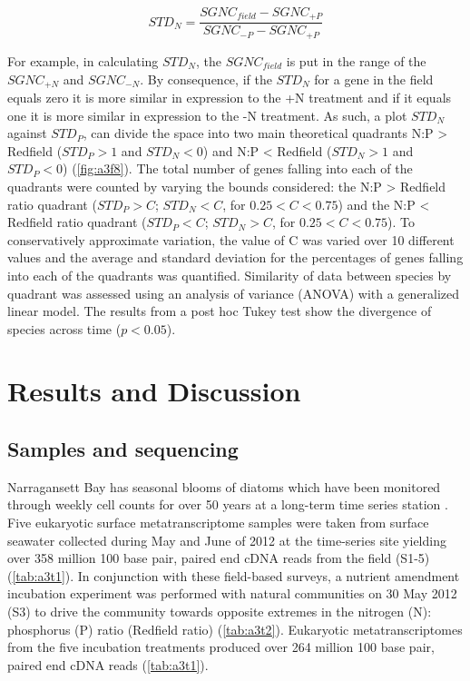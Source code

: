 \begin{equation}
	\label{eq:STDP}
	STD_N = \frac{SGNC_{field} - SGNC_{+P}}{SGNC_{-P} - SGNC_{+P}} 	
\end{equation}

For example, in calculating $STD_N$, the $SGNC_{field}$ is put in the range of the $SGNC_{+N}$ and $SGNC_{-N}$. By consequence, if the $STD_N$ for a gene in the field equals zero it is more similar in expression to the +N treatment and if it equals one it is more similar in expression to the -N treatment. As such, a plot $STD_N$ against $STD_P$, can divide the space into two main theoretical quadrants N:P > Redfield ($STD_P > 1$ and $STD_N < 0$) and N:P < Redfield ($STD_N > 1$ and $STD_P < 0$) (\cref{fig:a3f8}). The total number of genes falling into each of the quadrants were counted by varying the bounds considered: the N:P > Redfield ratio quadrant ($STD_P > C$; $STD_N < C$, for $0.25 < C < 0.75$) and the N:P < Redfield ratio quadrant ($STD_P < C$; $STD_N > C$, for $0.25 < C < 0.75$). To conservatively approximate variation, the value of C was varied over 10 different values and the average and standard deviation for the percentages of genes falling into each of the quadrants was quantified. Similarity of data between species by quadrant was assessed using an analysis of variance (ANOVA) with a generalized linear model. The results from a post hoc Tukey test show the divergence of species across time ($p < 0.05$).

\section{Results and Discussion}
\subsection{Samples and sequencing}
Narragansett Bay has seasonal blooms of diatoms which have been monitored through weekly cell counts for over 50 years at a long-term time series station \citep{Borkman2009, Li1998}. Five eukaryotic surface metatranscriptome samples were taken from surface seawater collected during May and June of 2012 at the time-series site yielding over 358 million 100 base pair, paired end cDNA reads from the field (S1-5) (\cref{tab:a3t1}). In conjunction with these field-based surveys, a nutrient amendment incubation experiment was performed with natural communities on 30 May 2012 (S3) to drive the community towards opposite extremes in the nitrogen (N): phosphorus (P) ratio (Redfield ratio) (\cref{tab:a3t2}). Eukaryotic metatranscriptomes from the five incubation treatments produced over 264 million 100 base pair, paired end cDNA reads (\cref{tab:a3t1}).\par

